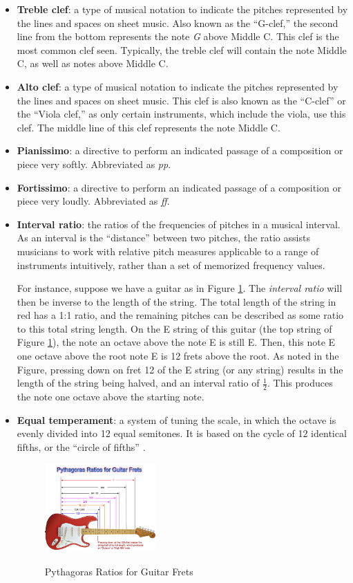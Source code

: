 \begin{itemize}
    \item {\textbf{Treble clef}: a type of musical notation to indicate the pitches represented by the lines and spaces on sheet music. Also known as the ``G-clef,'' the second line from the bottom represents the note \textit{G} above Middle C. This clef is the most common clef seen. Typically, the treble clef will contain the note Middle C, as well as notes above Middle C.}
    \item {\textbf{Alto clef}: a type of musical notation to indicate the pitches represented by the lines and spaces on sheet music. This clef is also known as the ``C-clef'' or the ``Viola clef,'' as only certain instruments, which include the viola, use this clef. The middle line of this clef represents the note Middle C.}
    \item {\textbf{Pianissimo}: a directive to perform an indicated passage of a composition or piece very softly. Abbreviated as \textit{pp}.}
    \item {\textbf{Fortissimo}: a directive to perform an indicated passage of a composition or piece very loudly. Abbreviated as \textit{ff}.}
    \item {\textbf{Interval ratio}: the ratios of the frequencies of pitches in a musical interval. As an interval is the ``distance'' between two pitches, the ratio assists musicians to work with relative pitch measures applicable to a range of instruments intuitively, rather than a set of memorized frequency values.}
    
    For instance, suppose we have a guitar as in Figure \ref{fig:guitar-math}. The \textit{interval ratio} will then be inverse to the length of the string. The total length of the string in red has a 1:1 ratio, and the remaining pitches can be described as some ratio to this total string length. On the E string of this guitar (the top string of Figure \ref{fig:guitar-math}), the note an octave above the note E is still E. Then, this note E one octave above the root note E is 12 frets above the root. As noted in the Figure, pressing down on fret 12 of the E string (or any string) results in the length of the string being halved, and an interval ratio of $\frac{1}{2}$. This produces the note one octave above the starting note.
    \item {\textbf{Equal temperament}: a system of tuning the scale, in which the octave is evenly divided into 12 equal semitones. It is based on the cycle of 12 identical fifths, or the ``circle of fifths'' \cite{Cochrane_2011}.}
    
    \begin{figure}[H]
        \centering
        \includegraphics[width=0.4\textwidth]{figures/guitar-math.jpeg}
        \caption{Pythagoras Ratios for Guitar Frets}\cite{Passy_2012}
        \label{fig:guitar-math}
    \end{figure}
    
\end{itemize}